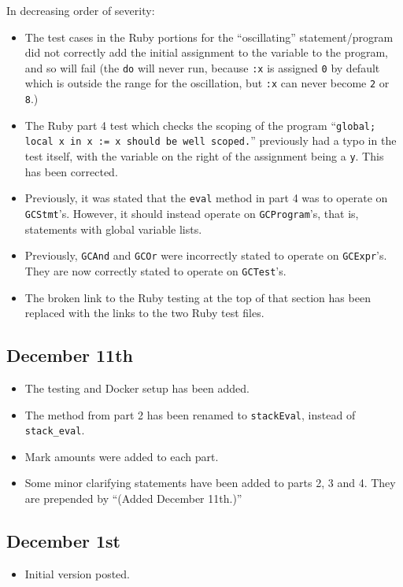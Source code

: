 \documentclass[11pt]{article}
\theoremstyle{definition}
\begin{document}
In decreasing order of severity:
\begin{itemize}
\item The test cases in the Ruby portions for the “oscillating” statement/program
did not correctly add the initial assignment to the variable
to the program, and so will fail (the \texttt{do} will never run,
because \texttt{:x} is assigned \texttt{0} by default which is outside the
range for the oscillation, but \texttt{:x} can never become \texttt{2} or \texttt{8}.)
\item The Ruby part 4 test which checks the scoping of the program
“\texttt{global; local x in x := x should be well scoped.}”
previously had a typo in the test itself,
with the variable on the right of the assignment being a \texttt{y}.
This has been corrected.
\item Previously, it was stated that the \texttt{eval} method in part 4
was to operate on \texttt{GCStmt}'s. However, it should instead
operate on \texttt{GCProgram}'s, that is, statements with global variable lists.
\item Previously, \texttt{GCAnd} and \texttt{GCOr} were incorrectly stated
to operate on \texttt{GCExpr}'s. They are now correctly stated to operate
on \texttt{GCTest}'s.
\item The broken link to the Ruby testing at the top of that section
has been replaced with the links to the two Ruby test files.
\end{itemize}

\subsection*{December 11th}
\label{sec:orgbc0b3e9}
\begin{itemize}
\item The testing and Docker setup has been added.
\item The method from part 2 has been renamed to \texttt{stackEval},
instead of \texttt{stack\_eval}.
\item Mark amounts were added to each part.
\item Some minor clarifying statements have been added to parts 2, 3 and 4.
They are prepended by “(Added December 11th.)”
\end{itemize}

\subsection*{December 1st}
\label{sec:org5189b70}
\begin{itemize}
\item Initial version posted.
\end{itemize}
\end{document}
